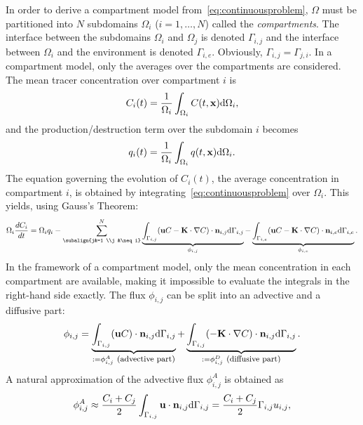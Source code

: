In order to derive a compartment model from~\eqref{eq:continuousproblem}, $\Omega$ must be partitioned into $N$ subdomains $\Omega_i$ ($i = 1,\dots,N$) called the \textit{compartments}. The interface between the subdomains $\Omega_i$ and $\Omega_j$ is denoted $\Gamma_{i,j}$ and the interface between $\Omega_i$ and the environment is denoted $\Gamma_{i,e}$. Obviously, $\Gamma_{i,j} = \Gamma_{j,i}$. In a compartment model, only the averages over the compartments are considered. The mean tracer concentration over compartment $i$ is 
\begin{equation} \label{eq:C_i(t)}
	C_i(t) = \frac{1}{\Omega_i} \int_{\Omega_i} C(t,\mathbf x) \mathrm d\Omega_i,
\end{equation}
and the production/destruction term over the subdomain $i$ becomes
\begin{equation}
	q_i(t) =  \frac{1}{\Omega_i} \int_{\Omega_i} q(t,\mathbf x) \mathrm d\Omega_i.
\end{equation}
The equation governing the evolution of $C_i(t)$, the average concentration in compartment $i$, is obtained by integrating~\eqref{eq:continuousproblem} over $\Omega_i$. This yields, using Gauss's Theorem:
\begin{equation}
	\Omega_i \frac{d C_i}{d t} = \Omega_i q_i - \sum_{\subalign{j&=1 \\j &\neq i}}^N \underbrace{\int_{\Gamma_{i,j}} (\b u C - \b K \cdot \nabla C)\cdot \b n_{i,j} \rm d\Gamma_{i,j}}_{\phi_{i,j}} - \underbrace{\int_{\Gamma_{i,e}} (\b u C - \b K \cdot \nabla C)\cdot \b n_{i,e} \rm d\Gamma_{i,e}}_{\phi_{i,e}}.
\end{equation}
In the framework of a compartment model, only the mean concentration in each compartment are available, making it impossible to evaluate the integrals in the right-hand side exactly. The flux $\phi_{i,j}$ can be split into an advective and a diffusive part:
\begin{equation} \label{eq:phi_i,j}
	\phi_{i,j} = \underbrace{\int_{\Gamma_{i,j}} (\mathbf u C)\cdot \mathbf n_{i,j} \mathrm d\Gamma_{i,j}}_{:= \phi_{i,j}^A \mbox{ \footnotesize (advective part)}} + \underbrace{\int_{\Gamma_{i,j}} (-\mathbf K \cdot \nabla C)\cdot \mathbf n_{i,j} \mathrm d\Gamma_{i,j}}_{:= \phi_{i,j}^D \mbox{ \footnotesize (diffusive part)}}.
\end{equation} 
A natural approximation of the advective flux $\phi_{i,j}^A$ is obtained as
\begin{equation}
	\phi_{i,j}^A \approx \frac{C_i + C_j}{2} \int_{\Gamma_{i,j}} \mathbf u \cdot \mathbf n_{i,j} \mathrm d\Gamma_{i,j} =  \frac{C_i + C_j}{2} \Gamma_{i,j} u_{i,j},
\end{equation}
